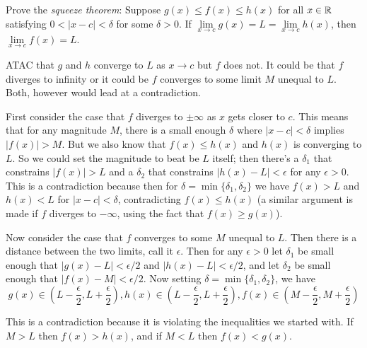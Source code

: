 \documentclass{article}
\begin{document}
\begin{problem}
Prove the \textit{squeeze theorem}: Suppose $g(x) \leq f(x) \leq h(x)$ for all $x \in \mathbb{R}$ satisfying $0 < |x - c| < \delta$ for some $\delta > 0$. If $\lim\limits_{x \to c} g(x) = L = \lim\limits_{x \to c} h(x)$, then $\lim\limits_{x \to c} f(x) = L$.
\end{problem}

ATAC that $g$ and $h$ converge to $L$ as $x \to c$ but $f$ does not. It could be that $f$ diverges to infinity or it could be $f$ converges to some limit $M$ unequal to $L$. Both, however would lead at a contradiction.

First consider the case that $f$ diverges to $\pm \infty$ as $x$ gets closer to $c$. This means that for any magnitude $M$, there is a small enough $\delta$ where $|x - c| < \delta$ implies $|f(x)| > M$. But we also know that $f(x) \leq h(x)$ and $h(x)$ is converging to $L$. So we could set the magnitude to beat be $L$ itself; then there's a $\delta_1$ that constrains $|f(x)| > L$ and a $\delta_2$ that constrains $|h(x) - L| < \epsilon$ for any $\epsilon > 0$. This is a contradiction because then for $\delta = \min\{\delta_1, \delta_2\}$ we have $f(x) > L$ and $h(x) < L$ for $|x - c| < \delta$, contradicting $f(x) \leq h(x)$ (a similar argument is made if $f$ diverges to $-\infty$, using the fact that $f(x) \geq g(x)$).

Now consider the case that $f$ converges to some $M$ unequal to $L$. Then there is a distance between the two limits, call it $\epsilon$. Then for any $\epsilon > 0$ let $\delta_1$ be small enough that $|g(x) - L| < \epsilon / 2$ and $|h(x) - L | < \epsilon / 2$, and let $\delta_2$ be small enough that $|f(x) - M| < \epsilon / 2$. Now setting $\delta = \min\{\delta_1, \delta_2\}$, we have
$$g(x) \in \left(L - \frac{\epsilon}{2}, L + \frac{\epsilon}{2}\right), h(x) \in \left(L - \frac{\epsilon}{2}, L + \frac{\epsilon}{2}\right), f(x) \in \left(M - \frac{\epsilon}{2}, M + \frac{\epsilon}{2}\right)$$

This is a contradiction because it is violating the inequalities we started with. If $M > L$ then $f(x) > h(x)$, and if $M < L$ then $f(x) < g(x)$.
\end{document}
